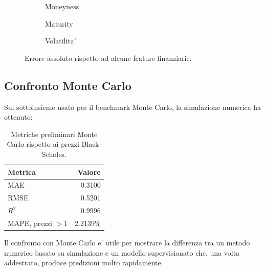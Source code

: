 \begin{figure}[H]
    \centering
    \begin{subfigure}{0.32\linewidth}
        \centering
        \caption{Moneyness}
    \end{subfigure}
    \begin{subfigure}{0.32\linewidth}
        \centering
        \caption{Maturity}
    \end{subfigure}
    \begin{subfigure}{0.32\linewidth}
        \centering
        \caption{Volatilita'}
    \end{subfigure}
    \caption{Errore assoluto rispetto ad alcune feature finanziarie.}
\end{figure}

\subsection{Confronto Monte Carlo}

Sul sottoinsieme usato per il benchmark Monte Carlo, la simulazione numerica ha ottenuto:

\begin{table}[H]
    \centering
    \begin{tabular}{lr}
        \toprule
        Metrica & Valore \\
        \midrule
        MAE & 0.3100 \\
        RMSE & 0.5201 \\
        $R^2$ & 0.9996 \\
        MAPE, prezzi $> 1$ & 2.2139\% \\
        \bottomrule
    \end{tabular}
    \caption{Metriche preliminari Monte Carlo rispetto ai prezzi Black-Scholes.}
\end{table}

Il confronto con Monte Carlo e' utile per mostrare la differenza tra un metodo numerico basato su simulazione e un modello supervisionato che, una volta addestrato, produce predizioni molto rapidamente.

